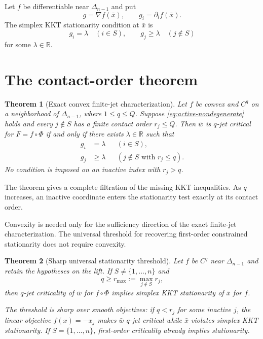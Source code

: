 \documentclass[11pt]{article}
\newtheorem{theorem}{Theorem}[section]
\theoremstyle{definition}
\theoremstyle{remark}
\newcommand{\R}{\mathbb{R}}
\newcommand{\simplex}{\Delta_{n-1}}
\begin{document}
Let $f$ be differentiable near $\simplex$ and put
\[
  g=\nabla f(\bar x),\qquad g_i=\partial_i f(\bar x).
\]
The simplex KKT stationarity condition at $\bar x$ is
\begin{equation}\label{eq:kkt}
  g_i=\lambda\quad(i\in S),
  \qquad
  g_j\ge\lambda\quad(j\notin S)
\end{equation}
for some $\lambda\in\R$.

\section{The contact-order theorem}\label{sec:main}

\begin{theorem}[Exact convex finite-jet characterization]\label{thm:convex}
Let $f$ be convex and $C^q$ on a neighborhood of $\simplex$, where
$1\le q\le Q$. Suppose \eqref{eq:active-nondegenerate} holds and every
$j\notin S$ has a finite contact order $r_j\le Q$. Then $\bar w$ is
$q$-jet critical for $F=f\circ\Phi$ if and only if there exists
$\lambda\in\R$ such that
\begin{align}
  g_i&=\lambda &&(i\in S),\label{eq:active-equality}\\
  g_j&\ge\lambda &&(j\notin S\text{ with }r_j\le q).
  \label{eq:visible-inequality}
\end{align}
No condition is imposed on an inactive index with $r_j>q$.
\end{theorem}

The theorem gives a complete filtration of the missing KKT inequalities. As
$q$ increases, an inactive coordinate enters the stationarity test exactly at
its contact order.

Convexity is needed only for the sufficiency direction of the exact
finite-jet characterization. The universal threshold for recovering
first-order constrained stationarity does not require convexity.

\begin{theorem}[Sharp universal stationarity threshold]\label{thm:threshold}
Let $f$ be $C^q$ near $\simplex$ and retain the hypotheses on the lift. If
$S\ne\{1,\ldots,n\}$ and
\[
  q\ge r_{\max}:=\max_{j\notin S}r_j,
\]
then $q$-jet criticality of $\bar w$ for $f\circ\Phi$ implies simplex KKT
stationarity of $\bar x$ for $f$.

The threshold is sharp over smooth objectives: if $q<r_j$ for some inactive
$j$, the linear objective $f(x)=-x_j$ makes $\bar w$ $q$-jet critical while
$\bar x$ violates simplex KKT stationarity. If $S=\{1,\ldots,n\}$, first-order
criticality already implies stationarity.
\end{theorem}
\end{document}
